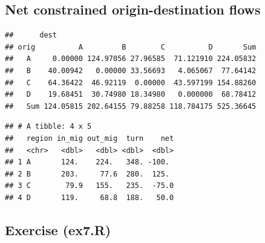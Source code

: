 \documentclass[
]{book}
\newenvironment{Shaded}{\begin{snugshade}}{\end{snugshade}}
\newcommand{\AttributeTok}[1]{\textcolor[rgb]{0.77,0.63,0.00}{#1}}
\newcommand{\ConstantTok}[1]{\textcolor[rgb]{0.00,0.00,0.00}{#1}}
\newcommand{\DecValTok}[1]{\textcolor[rgb]{0.00,0.00,0.81}{#1}}
\newcommand{\FunctionTok}[1]{\textcolor[rgb]{0.00,0.00,0.00}{#1}}
\newcommand{\NormalTok}[1]{#1}
\newcommand{\OtherTok}[1]{\textcolor[rgb]{0.56,0.35,0.01}{#1}}
\newcommand{\SpecialCharTok}[1]{\textcolor[rgb]{0.00,0.00,0.00}{#1}}
\begin{document}
\hypertarget{net-constrained-origin-destination-flows-4}{%
\subsection{Net constrained origin-destination flows}\label{net-constrained-origin-destination-flows-4}}

\begin{Shaded}
\end{Shaded}

\begin{verbatim}
##      dest
## orig          A         B        C          D       Sum
##   A     0.00000 124.97056 27.96585  71.121910 224.05832
##   B    40.00942   0.00000 33.56693   4.065067  77.64142
##   C    64.36422  46.92119  0.00000  43.597199 154.88260
##   D    19.68451  30.74980 18.34980   0.000000  68.78412
##   Sum 124.05815 202.64155 79.88258 118.784175 525.36645
\end{verbatim}

\begin{Shaded}
\end{Shaded}

\begin{verbatim}
## # A tibble: 4 x 5
##   region in_mig out_mig  turn    net
##   <chr>   <dbl>   <dbl> <dbl>  <dbl>
## 1 A       124.    224.   348. -100. 
## 2 B       203.     77.6  280.  125. 
## 3 C        79.9   155.   235.  -75.0
## 4 D       119.     68.8  188.   50.0
\end{verbatim}

\hypertarget{exercise-ex7.r}{%
\subsection{Exercise (ex7.R)}\label{exercise-ex7.r}}
\end{document}
